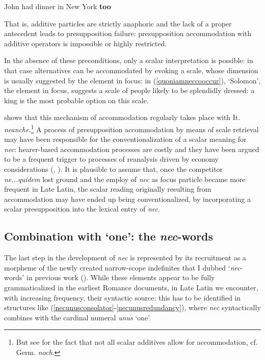 \documentclass[output=paper,modfonts,nonflat,citecolor=brown,
showindex
]{langsci/langscibook}
\begin{document}
{\begin{exe}
\ex {}  John had dinner in New York {\bf{too}}
\end{exe}}

\noindent That is, additive particles are strictly anaphoric and the lack of a proper antecedent leads to presupposition failure: presupposition accommodation with additive operators is impossible or highly restricted. 

In the absence of these preconditions, only a scalar interpretation is possible: in that case alternatives can be accommodated by evoking a scale, whose dimension is usually suggested by the element in focus: in (\ref{quoniamneccooccur}), `Solomon', the element in focus, suggests a scale of people likely to be splendidly dressed: a king is the most probable option on this scale. 

\citet{Tovena06} shows that this mechanism of accommodation regularly takes place with It. {\em{neanche}}.{\footnote{But see \citet{Umbach12} for the fact that not all scalar additives allow for accommodation, cf. Germ. {\em{noch}}.}} A process of presupposition accommodation by means of scale retrieval may have been responsible for the conventionalization of a scalar meaning for {\em{nec}}: hearer-based accommodation processes are costly and they have been argued to be a frequent trigger to processes of reanalysis driven by economy considerations (\citealt[]{TraugottDasher02, Eckardt06}, \citealt[]{SchwenterWaltereit10}). It is plausible to assume that, once the competitor {\em{ne...quidem}} lost ground and the employ of {\em{nec}} as focus particle became more frequent in Late Latin, the scalar reading originally resulting from accommodation may have ended up being conventionalized, by incorporating a scalar presupposition into the lexical entry of {\em{nec}}.
                                                     
\subsection{Combination with `one': the {\em{nec}}-words} \label{necwordssection}

The last step in the development of {\em{nec}} is represented by its recruitment as a morpheme of the newly created narrow-scope indefinites that I dubbed `{\em{nec}}-words' in previous work (\citealt[chapter 5]{Gianollo18}). While these elements appear to be fully grammaticalized in the earliest Romance documents, in Late Latin we encounter, with increasing frequency, their syntactic source: this has to be identified in structures like (\ref{necunusconsolator}-\ref{necunusredundancy}), where {\em{nec}} syntactically combines with the cardinal numeral {\em{unus}} `one'.
\end{document}
